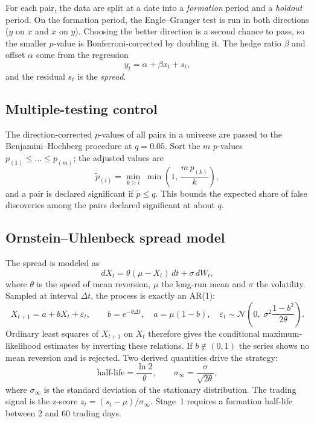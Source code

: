 \documentclass[11pt]{article}
\begin{document}
For each pair, the data are split at a date into a \emph{formation} period and a
\emph{holdout} period. On the formation period, the Engle--Granger test is run in both
directions ($y$ on $x$ and $x$ on $y$). Choosing the better direction is a second chance to
pass, so the smaller $p$-value is Bonferroni-corrected by doubling it. The hedge ratio
$\beta$ and offset $\alpha$ come from the regression
\begin{equation}
  y_t = \alpha + \beta x_t + s_t ,
\end{equation}
and the residual $s_t$ is the \emph{spread}.

\subsection{Multiple-testing control}

The direction-corrected $p$-values of all pairs in a universe are passed to the
Benjamini--Hochberg procedure at $q=0.05$. Sort the $m$ $p$-values
$p_{(1)}\le\dots\le p_{(m)}$; the adjusted values are
\begin{equation}
  \tilde p_{(i)} = \min_{k\ge i}\; \min\!\left(1,\, \frac{m\,p_{(k)}}{k}\right),
\end{equation}
and a pair is declared significant if $\tilde p \le q$. This bounds the expected share of
false discoveries among the pairs declared significant at about $q$.

\subsection{Ornstein--Uhlenbeck spread model}

The spread is modeled as
\begin{equation}
  dX_t = \theta(\mu - X_t)\,dt + \sigma\,dW_t ,
\end{equation}
where $\theta$ is the speed of mean reversion, $\mu$ the long-run mean and $\sigma$ the
volatility. Sampled at interval $\Delta t$, the process is exactly an AR(1):
\begin{equation}
  X_{t+1} = a + b X_t + \varepsilon_t,\qquad b=e^{-\theta\Delta t},\quad a=\mu(1-b),\quad
  \varepsilon_t\sim\mathcal N\!\left(0,\;\sigma^2\frac{1-b^2}{2\theta}\right).
\end{equation}
Ordinary least squares of $X_{t+1}$ on $X_t$ therefore gives the conditional
maximum-likelihood estimates by inverting these relations. If $b\notin(0,1)$ the series shows
no mean reversion and is rejected. Two derived quantities drive the strategy:
\begin{equation}
  \text{half-life} = \frac{\ln 2}{\theta},\qquad
  \sigma_{\infty} = \frac{\sigma}{\sqrt{2\theta}} ,
\end{equation}
where $\sigma_\infty$ is the standard deviation of the stationary distribution. The trading
signal is the z-score $z_t=(s_t-\mu)/\sigma_\infty$. Stage~1 requires a formation half-life
between 2 and 60 trading days.
\end{document}
